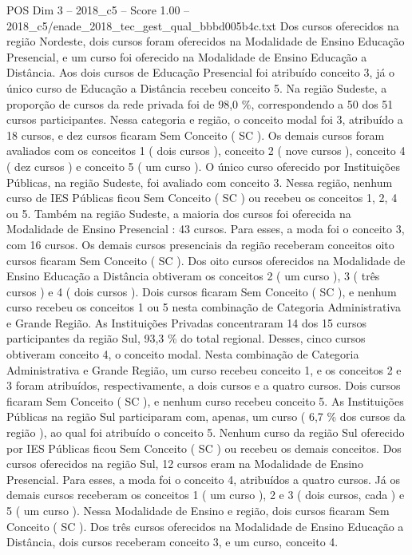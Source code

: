 \begin{textsample}{POS Dim 3 – 2018\_c5 – Score 1.00 – 2018\_c5/enade\_2018\_tec\_gest\_qual\_bbbd005b4c.txt}
Dos cursos oferecidos na região Nordeste, dois cursos foram oferecidos na Modalidade de Ensino Educação Presencial, e um curso foi oferecido na Modalidade de Ensino Educação a Distância.
Aos dois cursos de Educação Presencial foi atribuído conceito 3, já o único curso de Educação a Distância recebeu conceito 5.
Na região Sudeste, a proporção de cursos da rede privada foi de 98,0 \%, correspondendo a 50 dos 51 cursos participantes.
Nessa categoria e região, o conceito modal foi 3, atribuído a 18 cursos, e dez cursos ficaram Sem Conceito ( SC ).
Os demais cursos foram avaliados com os conceitos 1 ( dois cursos ), conceito 2 ( nove cursos ), conceito 4 ( dez cursos ) e conceito 5 ( um curso ).
O único curso oferecido por Instituições Públicas, na região Sudeste, foi avaliado com conceito 3.
Nessa região, nenhum curso de IES Públicas ficou Sem Conceito ( SC ) ou recebeu os conceitos 1, 2, 4 ou 5.
Também na região Sudeste, a maioria dos cursos foi oferecida na Modalidade de Ensino Presencial : 43 cursos.
Para esses, a moda foi o conceito 3, com 16 cursos.
Os demais cursos presenciais da região receberam conceitos oito cursos ficaram Sem Conceito ( SC ).
Dos oito cursos oferecidos na Modalidade de Ensino Educação a Distância obtiveram os conceitos 2 ( um curso ), 3 ( três cursos ) e 4 ( dois cursos ).
Dois cursos ficaram Sem Conceito ( SC ), e nenhum curso recebeu os conceitos 1 ou 5 nesta combinação de Categoria Administrativa e Grande Região.
As Instituições Privadas concentraram 14 dos 15 cursos participantes da região Sul, 93,3 \% do total regional.
Desses, cinco cursos obtiveram conceito 4, o conceito modal.
Nesta combinação de Categoria Administrativa e Grande Região, um curso recebeu conceito 1, e os conceitos 2 e 3 foram atribuídos, respectivamente, a dois cursos e a quatro cursos.
Dois cursos ficaram Sem Conceito ( SC ), e nenhum curso recebeu conceito 5.
As Instituições Públicas na região Sul participaram com, apenas, um curso ( 6,7 \% dos cursos da região ), ao qual foi atribuído o conceito 5.
Nenhum curso da região Sul oferecido por IES Públicas ficou Sem Conceito ( SC ) ou recebeu os demais conceitos.
Dos cursos oferecidos na região Sul, 12 cursos eram na Modalidade de Ensino Presencial.
Para esses, a moda foi o conceito 4, atribuídos a quatro cursos.
Já os demais cursos receberam os conceitos 1 ( um curso ), 2 e 3 ( dois cursos, cada ) e 5 ( um curso ).
Nessa Modalidade de Ensino e região, dois cursos ficaram Sem Conceito ( SC ).
Dos três cursos oferecidos na Modalidade de Ensino Educação a Distância, dois cursos receberam conceito 3, e um curso, conceito 4.

\end{textsample}
